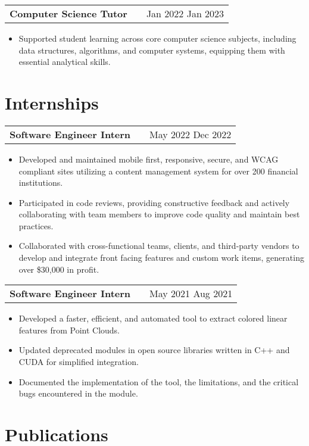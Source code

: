 \documentclass[a4paper,12pt]{article}
\makeatletter
\newenvironment{joblong}[2]
    {
    \begin{tabularx}{\linewidth}{@{}l X r@{}}
    \textbf{#1} & \hfill &  #2 \\[3.75pt]
    \end{tabularx}
    \begin{minipage}[t]{\linewidth}
    \begin{itemize}[nosep,after=\strut, leftmargin=1em, itemsep=3pt,label=--]
    }
    {
    \end{itemize}
    \end{minipage}    
    }
\makeatother
\begin{document}
\begin{joblong}{Computer Science Tutor}{Jan 2022 Jan 2023} %
\item Supported student learning across core computer science subjects, including data structures, algorithms, and computer systems, equipping them with essential analytical skills. %
\end{joblong}


\section{Internships}

\begin{joblong}{Software Engineer Intern}{May 2022 Dec 2022} %
\item Developed and maintained mobile first, responsive, secure, and WCAG compliant sites utilizing a content management system for over 200 financial institutions. %
\item Participated in code reviews, providing constructive feedback and actively collaborating with team members to improve code quality and maintain best practices. %
\item Collaborated with cross-functional teams, clients, and third-party vendors to develop and integrate front facing features and custom work items, generating over \$30,000 in profit. %
\end{joblong}

\begin{joblong}{Software Engineer Intern}{May 2021 Aug 2021} %
\item Developed a faster, efficient, and automated tool to extract colored linear features from Point Clouds. %
\item Updated deprecated modules in open source libraries written in C++ and CUDA for simplified integration. %
\item Documented the implementation of the tool, the limitations, and the critical bugs encountered in the module. %
\end{joblong}

\section{Publications}
\begin{refsection}
\nocite{*} %
\printbibliography[heading=none]
\end{refsection}
\end{document}
